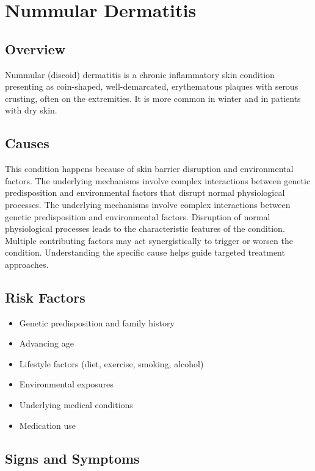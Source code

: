 \chapter{Nummular Dermatitis}
\label{sec:Nummular Dermatitis}

\section{Overview}
Nummular (discoid) dermatitis is a chronic inflammatory skin condition presenting as coin-shaped, well-demarcated, erythematous plaques with serous crusting, often on the extremities. It is more common in winter and in patients with dry skin.
\section{Causes}
This condition happens because of skin barrier disruption and environmental factors. The underlying mechanisms involve complex interactions between genetic predisposition and environmental factors that disrupt normal physiological processes. The underlying mechanisms involve complex interactions between genetic predisposition and environmental factors. Disruption of normal physiological processes leads to the characteristic features of the condition. Multiple contributing factors may act synergistically to trigger or worsen the condition. Understanding the specific cause helps guide targeted treatment approaches.
\section{Risk Factors}


\begin{itemize}[noitemsep]
  \item Genetic predisposition and family history
  \item Advancing age
  \item Lifestyle factors (diet, exercise, smoking, alcohol)
  \item Environmental exposures
  \item Underlying medical conditions
  \item Medication use
\end{itemize}
\section{Signs and Symptoms}

